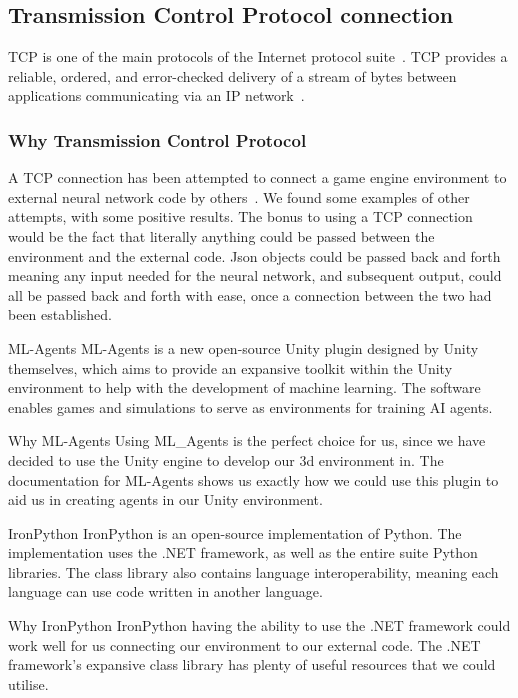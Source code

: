 \subsection{Transmission Control Protocol connection}
TCP is one of the main protocols of the Internet protocol suite~\cite{TCP}. 
TCP provides a reliable, ordered, and error-checked delivery of a stream of bytes between applications communicating via an IP network~\cite{TCPsdx}. 

\subsubsection{Why Transmission Control Protocol}
A TCP connection has been attempted to connect a game engine environment to external neural network code by others~\cite{UnityTCP}. We found some examples of other attempts, with some positive results. The bonus to using a TCP connection would be the fact that literally anything could be passed between the environment and the external code. Json objects could be passed back and forth meaning any input needed for the neural network, and subsequent output, could all be passed back and forth with ease, once a connection between the two had been established.

ML-Agents
ML-Agents is a new open-source Unity plugin designed by Unity themselves, which aims to provide an expansive toolkit within the Unity environment to help with the development of machine learning. The software enables games and simulations to serve as environments for training AI agents. 

Why ML-Agents
Using ML_Agents is the perfect choice for us, since we have decided to use the Unity engine to develop our 3d environment in. The documentation for ML-Agents shows us exactly how we could use this plugin to aid us in creating agents in our Unity environment.






IronPython
IronPython is an open-source implementation of Python. The implementation uses the .NET framework, as well as the entire suite Python libraries. The class library also contains language interoperability, meaning each language can use code written in another language.

Why IronPython
IronPython having the ability to use the .NET framework could work well for us connecting our environment to our external code. The .NET framework’s expansive class library has plenty of useful resources that we could utilise.









